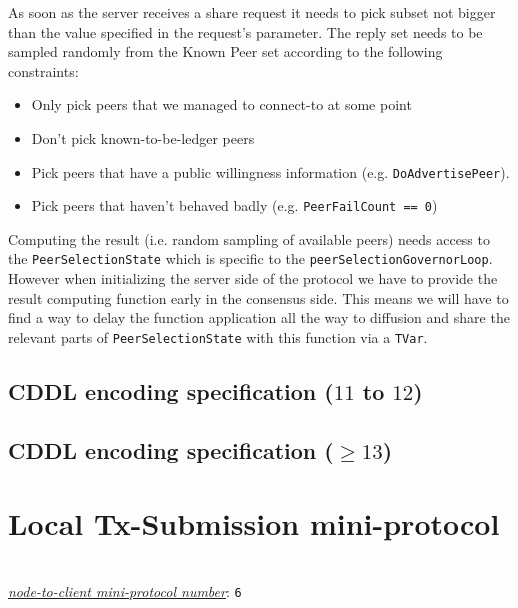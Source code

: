 As soon as the server receives a share request it needs to pick subset not bigger than the
value specified in the request's parameter. The reply set needs to be sampled randomly
from the Known Peer set according to the following constraints:

\begin{itemize}
  \item Only pick peers that we managed to connect-to at some point
  \item Don't pick known-to-be-ledger peers
  \item Pick peers that have a public willingness information (e.g. \texttt{DoAdvertisePeer}).
  \item Pick peers that haven't behaved badly (e.g. \texttt{PeerFailCount == 0})
\end{itemize}

Computing the result (i.e. random sampling of available peers) needs access to the
\texttt{PeerSelectionState} which is specific to the \texttt{peerSelectionGovernorLoop}. However when
initializing the server side of the protocol we have to provide the result computing
function early in the consensus side. This means we will have to find a way to delay the
function application all the way to diffusion and share the relevant parts of
\texttt{PeerSelectionState} with this function via a \texttt{TVar}.

\subsection{CDDL encoding specification ($11$ to $12$)}\label{peersharing-cddl}


\subsection{CDDL encoding specification ($\geq 13$)}\label{peersharing-cddl}


\section{Local Tx-Submission mini-protocol}
\\
\hyperref[table:node-to-client-protocol-numbers]{\textit{node-to-client mini-protocol number}}: \texttt{6}\\
\label{local-tx-submission-protocol}
